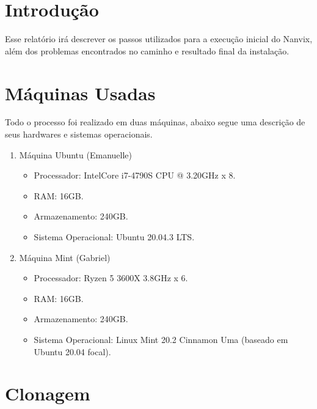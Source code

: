 \documentclass[12pt,
    oneside,
    brazil,
    sumario=tradicional,
    article,
    a4paper
]{abntex2}
\begin{document}
    \printcoverufsc

    \tableofcontents*
    \newpage

    \section{Introdução}\label{sec:introducao}

    Esse relatório irá descrever os passos utilizados para a execução inicial do Nanvix, além dos problemas encontrados no caminho e resultado final da instalação.

    \section{Máquinas Usadas}\label{sec:máquinas-usadas}

    Todo o processo foi realizado em duas máquinas, abaixo segue uma descrição de seus hardwares e sistemas operacionais.

    \begin{enumerate}
        \item Máquina Ubuntu (Emanuelle)\label{maquina-ubuntu}
            \begin{itemize}
                \item Processador: IntelCore i7-4790S CPU @ 3.20GHz x 8.
                \item RAM: 16GB.
                \item Armazenamento: 240GB.
                \item Sistema Operacional: Ubuntu 20.04.3 LTS.
            \end{itemize}
        \item Máquina Mint (Gabriel)\label{maquina-mint}
            \begin{itemize}
                \item Processador: Ryzen 5 3600X 3.8GHz x 6.
                \item RAM: 16GB.
                \item Armazenamento: 240GB.
                \item Sistema Operacional: Linux Mint 20.2 Cinnamon Uma (baseado em Ubuntu 20.04 focal).
            \end{itemize}
    \end{enumerate}

    \section{Clonagem}\label{sec:clonagem}
\end{document}
